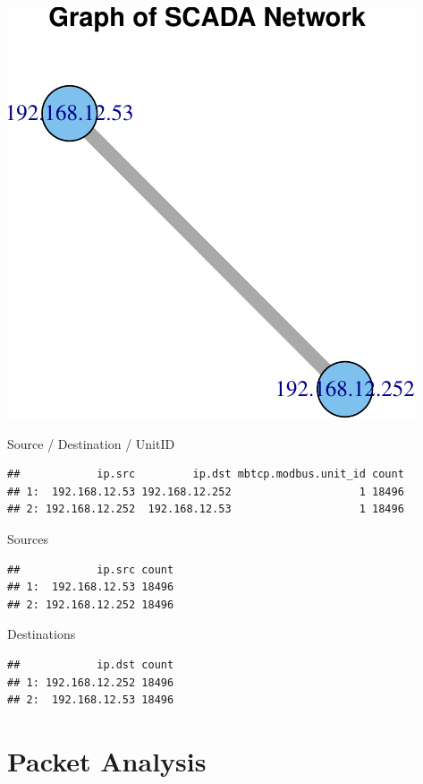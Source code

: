 \documentclass[]{article}
\begin{document}
\begin{center}\includegraphics{modbus_files/figure-latex/warning-1} \end{center}

Source / Destination / UnitID

\begin{verbatim}
##            ip.src         ip.dst mbtcp.modbus.unit_id count
## 1:  192.168.12.53 192.168.12.252                    1 18496
## 2: 192.168.12.252  192.168.12.53                    1 18496
\end{verbatim}

Sources

\begin{verbatim}
##            ip.src count
## 1:  192.168.12.53 18496
## 2: 192.168.12.252 18496
\end{verbatim}

Destinations

\begin{verbatim}
##            ip.dst count
## 1: 192.168.12.252 18496
## 2:  192.168.12.53 18496
\end{verbatim}

\section{Packet Analysis}\label{packet-analysis}
\end{document}
